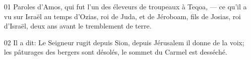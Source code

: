 01 Paroles d'Amos, qui fut l’un des éleveurs de troupeaux à Teqoa, --- ce qu’il a vu sur Israël au temps d’Ozias, roi de Juda, et de Jéroboam, fils de Josias, roi d’Israël, deux ans avant le tremblement de terre.

02 Il a dit: Le Seigneur rugit depuis Sion, depuis Jérusalem il donne de la voix; les pâturages des bergers sont désolés, le sommet du Carmel est desséché.
